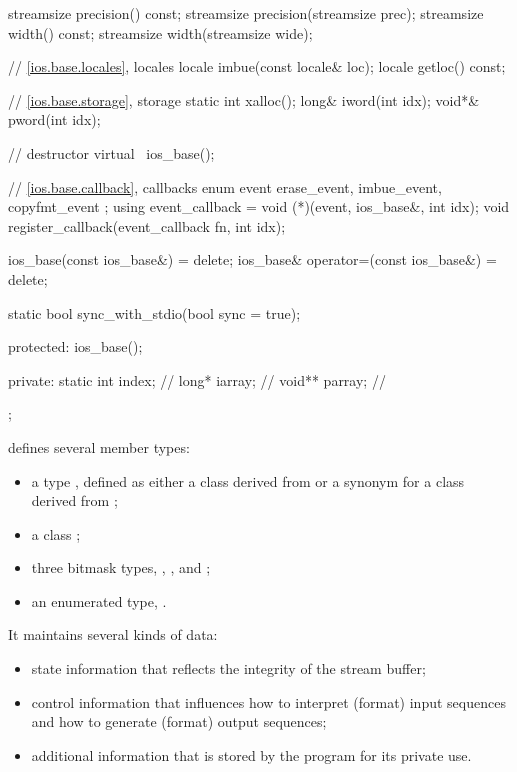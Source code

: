 \begin{codeblock}
{{    streamsize precision() const;
    streamsize precision(streamsize prec);
    streamsize width() const;
    streamsize width(streamsize wide);

    // \ref{ios.base.locales}, locales
    locale imbue(const locale& loc);
    locale getloc() const;

    // \ref{ios.base.storage}, storage
    static int xalloc();
    long&  iword(int idx);
    void*& pword(int idx);

    // destructor
    virtual ~ios_base();

    // \ref{ios.base.callback}, callbacks
    enum event { erase_event, imbue_event, copyfmt_event };
    using event_callback = void (*)(event, ios_base&, int idx);
    void register_callback(event_callback fn, int idx);

    ios_base(const ios_base&) = delete;
    ios_base& operator=(const ios_base&) = delete;

    static bool sync_with_stdio(bool sync = true);

  protected:
    ios_base();

  private:
    static int index;           // \expos
    long*  iarray;              // \expos
    void** parray;              // \expos
  };
}
\end{codeblock}

\pnum
{}
defines several member types:
\begin{itemize}
\item a type , defined as either a class derived from
 or a synonym for a class derived from ;

\item a class ;

\item three bitmask types, , , and ;

\item an enumerated type, .
\end{itemize}

\pnum
It maintains several kinds of data:
\begin{itemize}
\item
state information that reflects the integrity of the stream buffer;
\item
control information that influences how to interpret (format) input
sequences and how to generate (format) output sequences;
\item
additional information that is stored by the program for its private use.
\end{itemize}


